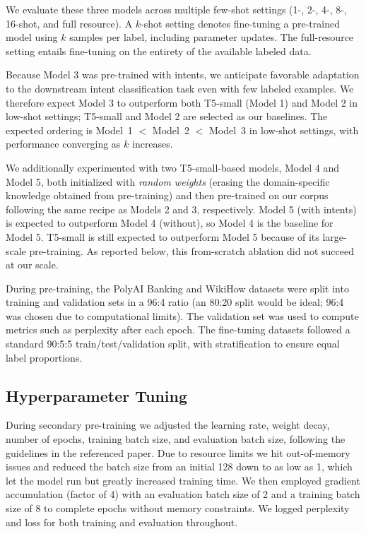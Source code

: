 \documentclass[11pt]{article}
\begin{document}
We evaluate these three models across multiple few-shot settings (1-, 2-,
4-, 8-, 16-shot, and full resource). A $k$-shot setting denotes fine-tuning
a pre-trained model using $k$ samples per label, including parameter
updates. The full-resource setting entails fine-tuning on the entirety of
the available labeled data.

Because Model 3 was pre-trained with intents, we anticipate favorable
adaptation to the downstream intent classification task even with few
labeled examples. We therefore expect Model 3 to outperform both T5-small
(Model 1) and Model 2 in low-shot settings; T5-small and Model 2 are
selected as our baselines. The expected ordering is
Model~1 $<$ Model~2 $<$ Model~3 in low-shot settings, with performance
converging as $k$ increases.

We additionally experimented with two T5-small-based models, Model 4 and
Model 5, both initialized with \emph{random weights} (erasing the
domain-specific knowledge obtained from pre-training) and then pre-trained
on our corpus following the same recipe as Models 2 and 3, respectively.
Model 5 (with intents) is expected to outperform Model 4 (without), so Model
4 is the baseline for Model 5. T5-small is still expected to outperform Model
5 because of its large-scale pre-training. As reported below, this
from-scratch ablation did not succeed at our scale.

During pre-training, the PolyAI Banking and WikiHow datasets were split into
training and validation sets in a 96:4 ratio (an 80:20 split would be ideal;
96:4 was chosen due to computational limits). The validation set was used to
compute metrics such as perplexity after each epoch. The fine-tuning
datasets followed a standard 90:5:5 train/test/validation split, with
stratification to ensure equal label proportions.

\subsection{Hyperparameter Tuning}

During secondary pre-training we adjusted the learning rate, weight decay,
number of epochs, training batch size, and evaluation batch size, following
the guidelines in the referenced paper. Due to resource limits we hit
out-of-memory issues and reduced the batch size from an initial 128 down to
as low as 1, which let the model run but greatly increased training time. We
then employed gradient accumulation (factor of 4) with an evaluation batch
size of 2 and a training batch size of 8 to complete epochs without memory
constraints. We logged perplexity and loss for both training and evaluation
throughout.
\end{document}
